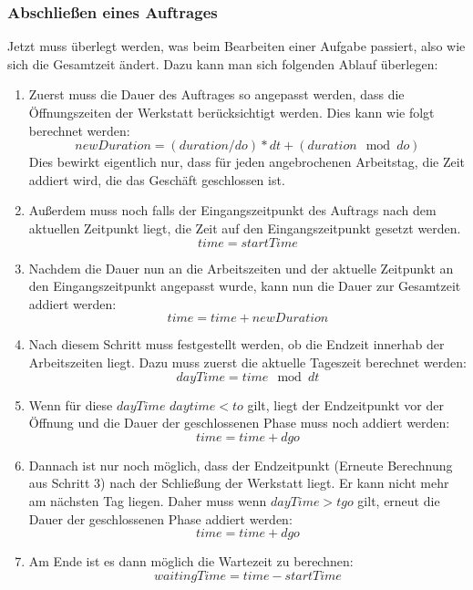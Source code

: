 \documentclass[a4paper,10pt,ngerman]{scrartcl}
\begin{document}
      \subsubsection{Abschließen eines Auftrages\label{sec:Loesungsidee:Abschliessen}}
        Jetzt muss überlegt werden, was beim Bearbeiten einer Aufgabe passiert, also wie sich die Gesamtzeit ändert.
        Dazu kann man sich folgenden Ablauf überlegen:
        \begin{enumerate}
          \item Zuerst muss die Dauer des Auftrages so angepasst werden, dass die Öffnungszeiten der Werkstatt berücksichtigt werden. Dies kann wie folgt berechnet werden:
          \begin{equation}
            newDuration = (duration / do)*dt + (duration \mod{do})
          \end{equation}
          Dies bewirkt eigentlich nur, dass für jeden angebrochenen Arbeitstag, die Zeit addiert wird, die das Geschäft geschlossen ist.
          \item Außerdem muss noch falls der Eingangszeitpunkt des Auftrags nach dem aktuellen Zeitpunkt liegt, die Zeit auf den Eingangszeitpunkt gesetzt werden.
          \begin{equation}
            time = startTime
          \end{equation}
          \item Nachdem die Dauer nun an die Arbeitszeiten und der aktuelle Zeitpunkt an den Eingangszeitpunkt angepasst wurde, kann nun die Dauer zur Gesamtzeit addiert werden:
            \begin{equation}
              time = time + newDuration
            \end{equation}
          \item Nach diesem Schritt muss festgestellt werden, ob die Endzeit innerhab der Arbeitszeiten liegt. Dazu muss zuerst die aktuelle Tageszeit berechnet werden:
            \begin{equation}
              dayTime = time \mod{dt}
            \end{equation}
          \item Wenn für diese $dayTime$ $daytime < to$ gilt, liegt der Endzeitpunkt vor der Öffnung und die Dauer der geschlossenen Phase muss noch addiert werden:
            \begin{equation}
              time = time + dgo
            \end{equation}
          \item Dannach ist nur noch möglich, dass der Endzeitpunkt (Erneute Berechnung aus Schritt 3) nach der Schließung der Werkstatt liegt. Er kann nicht mehr am nächsten Tag liegen. Daher muss wenn $dayTime > tgo$ gilt, erneut die Dauer der geschlossenen Phase addiert werden:
            \begin{equation}
              time = time + dgo
            \end{equation}
          \item Am Ende ist es dann möglich die Wartezeit zu berechnen:
            \begin{equation}
              waitingTime = time - startTime
            \end{equation}
        \end{enumerate}
\end{document}

